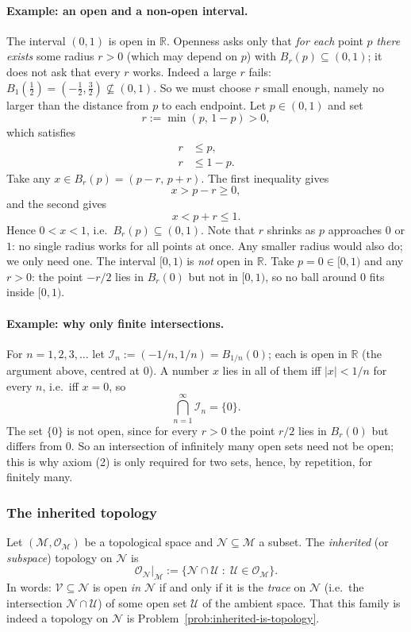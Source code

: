 \documentclass[11pt]{article}
\begin{document}
\paragraph{Example: an open and a non-open interval.} The interval $(0,1)$ is open in $\mathbb R$. Openness asks only that \emph{for each} point $p$ \emph{there exists} some radius $r>0$ (which may depend on $p$) with $B_r(p)\subseteq(0,1)$; it does not ask that every $r$ works. Indeed a large $r$ fails: $B_1(\tfrac12)=(-\tfrac12,\tfrac32)\not\subseteq(0,1)$. So we must choose $r$ small enough, namely no larger than the distance from $p$ to each endpoint. Let $p\in(0,1)$ and set
\[
r:=\min(p,\,1-p)>0,
\]
which satisfies
\begin{align*}
r&\le p,\\
r&\le 1-p.
\end{align*}
Take any $x\in B_r(p)=(p-r,\,p+r)$. The first inequality gives
\[
x>p-r\ge 0,
\]
and the second gives
\[
x<p+r\le 1.
\]
Hence $0<x<1$, i.e.\ $B_r(p)\subseteq(0,1)$. Note that $r$ shrinks as $p$ approaches $0$ or $1$: no single radius works for all points at once. Any smaller radius would also do; we only need one. The interval $[0,1)$ is \emph{not} open in $\mathbb R$. Take $p=0\in[0,1)$ and any $r>0$: the point $-r/2$ lies in $B_r(0)$ but not in $[0,1)$, so no ball around $0$ fits inside $[0,1)$.

\paragraph{Example: why only finite intersections.} For $n=1,2,3,\dots$ let $\mathcal I_n:=(-1/n,1/n)=B_{1/n}(0)$; each is open in $\mathbb R$ (the argument above, centred at $0$). A number $x$ lies in all of them iff $|x|<1/n$ for every $n$, i.e.\ iff $x=0$, so
\[
\bigcap_{n=1}^\infty\mathcal I_n=\{0\}.
\]
The set $\{0\}$ is not open, since for every $r>0$ the point $r/2$ lies in $B_r(0)$ but differs from $0$. So an intersection of infinitely many open sets need not be open; this is why axiom (2) is only required for two sets, hence, by repetition, for finitely many.

\subsubsection*{The inherited topology}
Let $(\mathcal M,\mathcal O_{\mathcal M})$ be a topological space and $\mathcal N\subseteq\mathcal M$ a subset. The \emph{inherited} (or \emph{subspace}) topology on $\mathcal N$ is
\[
\mathcal O_{\mathcal N}\big|_{\mathcal M}:=\{\mathcal N\cap\mathcal U \;:\; \mathcal U\in\mathcal O_{\mathcal M}\}.
\]
In words: $\mathcal V\subseteq\mathcal N$ is open \emph{in $\mathcal N$} if and only if it is the \emph{trace} on $\mathcal N$ (i.e.\ the intersection $\mathcal N\cap\mathcal U$) of some open set $\mathcal U$ of the ambient space. That this family is indeed a topology on $\mathcal N$ is Problem~\ref{prob:inherited-is-topology}.
\end{document}

